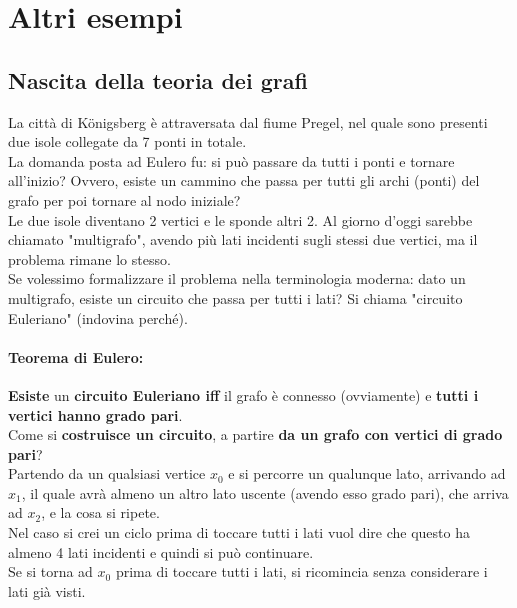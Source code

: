 
\section{Altri esempi}

\subsection*{Nascita della teoria dei grafi}

La città di K\"onigsberg è attraversata dal fiume Pregel, nel quale sono presenti due isole collegate da 7 ponti in totale.\\

La domanda posta ad Eulero fu: si può passare da tutti i ponti e tornare all'inizio? Ovvero, esiste un cammino che passa per tutti gli archi (ponti) del grafo per poi tornare al nodo iniziale?\\

Le due isole diventano 2 vertici e le sponde altri 2. Al giorno d'oggi sarebbe chiamato "multigrafo", avendo più lati incidenti sugli stessi due vertici, ma il problema rimane lo stesso.\\

Se volessimo formalizzare il problema nella terminologia moderna: dato un multigrafo, esiste un circuito che passa per tutti i lati? Si chiama "circuito Euleriano" (indovina perché).\\

\paragraph{Teorema di Eulero:} \textbf{Esiste} un \textbf{circuito Euleriano iff} il grafo è connesso (ovviamente) e \textbf{tutti i vertici hanno grado pari}.\\

Come si \textbf{costruisce un circuito}, a partire \textbf{da un grafo con vertici di grado pari}? \\
Partendo da un qualsiasi vertice $x_0$ e si percorre un qualunque lato, arrivando ad $x_1$, il quale avrà almeno un altro lato uscente (avendo esso grado pari), che arriva ad $x_2$, e la cosa si ripete.\\
Nel caso si crei un ciclo prima di toccare tutti i lati vuol dire che questo ha almeno 4 lati incidenti e quindi si può continuare.\\
Se si torna ad $x_0$ prima di toccare tutti i lati, si ricomincia senza considerare i lati già visti.\\

